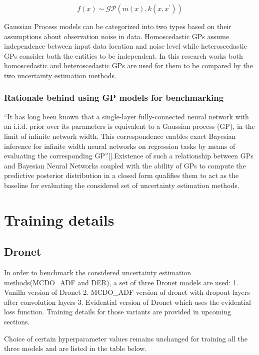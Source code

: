 \begin{equation}
	f(x)  \sim \mathcal{GP}(m(x),k(x, x^\prime))
\end{equation}

Gaussian Process models can be categorized into two types based on their assumptions about observation noise in data. Homoscedastic GPs assume independence between input data location and noise level while heteroscedastic GPs consider both the entities to be independent. In this research works both homoscedastic and heteroscedastic GPs are used for them to be compared by the two uncertainty estimation methods.
\subsubsection{Rationale behind using GP models for benchmarking}
\enquote{It has long been known that a single-layer fully-connected neural network with an i.i.d. prior over its parameters is equivalent to a Gaussian process (GP), in the limit of infinite network width. This correspondence enables exact Bayesian inference for infinite width neural networks on regression tasks by means of evaluating the corresponding GP}[\cite{lee2018deep}].Existence of such a relationship between GPs and Bayesian Neural Networks coupled with the ability of GPs to compute the predictive posterior distribution in a closed form qualifies them to act as the baseline for evaluating the considered set of uncertainty estimation methods.

\section{Training details}
\subsection{Dronet}
In order to benchmark the considered uncertainty estimation methods(MCDO\_ADF and DER), a set of three Dronet models are used: 1. Vanilla version of Dronet 2. MCDO\_ADF version of dronet with dropout layers after convolution layers 3. Evidential version of Dronet which uses the evidential loss function. Training details for those variants are provided in upcoming sections.

Choice of certain hyperparameter values remains unchanged for training all the three models and are listed in the table below.

